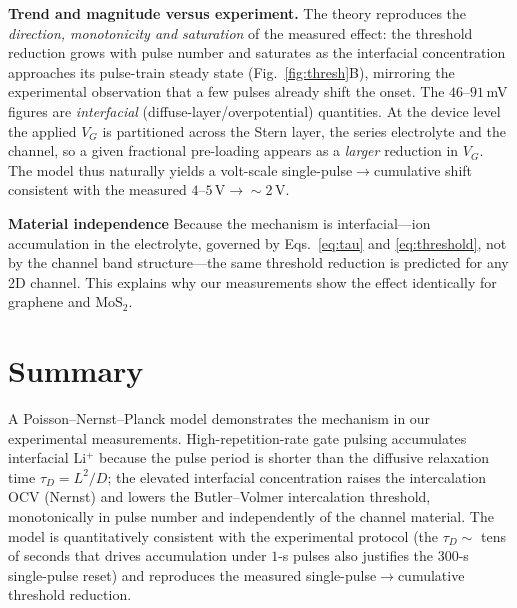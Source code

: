 \documentclass[11pt,a4paper]{article}
\newcommand{\Lip}{\ensuremath{\mathrm{Li^{+}}}}
\begin{document}
\textbf{Trend and magnitude versus experiment.} The theory reproduces the \emph{direction, monotonicity and saturation} of the
measured effect: the threshold reduction grows with pulse number and saturates as
the interfacial concentration approaches its pulse-train steady state
(Fig.~\ref{fig:thresh}B), mirroring the experimental observation that a few
pulses already shift the onset. The $46$--$91$\,mV figures are
\emph{interfacial} (diffuse-layer/overpotential) quantities. At the device
level the applied $V_G$ is partitioned across the Stern layer, the series
electrolyte and the channel, so a given fractional pre-loading appears as a
\emph{larger} reduction in $V_G$. The model thus naturally yields a volt-scale
single-pulse$\to$cumulative shift consistent with the measured
$4$--$5\,\text{V}\to{\sim}2\,\text{V}$.

\textbf{Material independence}
Because the mechanism is interfacial---ion accumulation in the electrolyte,
governed by Eqs.~\eqref{eq:tau} and \eqref{eq:threshold}, not by the channel band
structure---the same threshold reduction is predicted for any 2D channel. This
explains why our measurements show the effect identically for graphene and
$\mathrm{MoS_2}$.

\section{Summary}
A Poisson--Nernst--Planck model demonstrates
the mechanism in our experimental measurements. High-repetition-rate
gate pulsing accumulates interfacial \Lip{} because the pulse period is shorter
than the diffusive relaxation time $\tau_D=L^2/D$; the elevated interfacial
concentration raises the intercalation OCV (Nernst) and lowers
the Butler--Volmer intercalation threshold, monotonically in pulse number and
independently of the channel material. The model is quantitatively consistent
with the experimental protocol (the $\tau_D\sim$ tens of seconds that drives
accumulation under $1$-s pulses also justifies the $300$-s single-pulse reset)
and reproduces the measured single-pulse$\to$cumulative threshold reduction.
\end{document}
